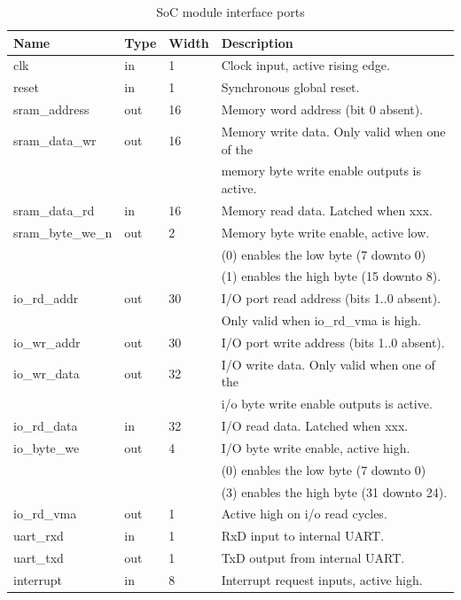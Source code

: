 \begin{table}[h]
\caption{SoC module interface ports}
\begin{tabularx}{\textwidth}{ lll|X }
\toprule
Name & Type & Width & Description \\
\midrule
clk                 & in    & 1  & Clock input, active rising edge. \\
reset               & in    & 1  & Synchronous global reset. \\
\midrule
sram\_address       & out   & 16 & Memory word address (bit 0 absent). \\
sram\_data\_wr      & out   & 16 & Memory write data. Only valid when one of the \\
                    &       &    & memory byte write enable outputs is active.\\
sram\_data\_rd      & in    & 16 & Memory read data. Latched when xxx. \\
sram\_byte\_we\_n   & out   & 2  & Memory byte write enable, active low.  \\
                    &       &    & (0) enables the low byte (7 downto 0) \\
                    &       &    & (1) enables the high byte (15 downto 8). \\
\midrule
io\_rd\_addr        & out   & 30 & I/O port read address (bits 1..0 absent). \\
                    &       &    & Only valid when io\_rd\_vma is high. \\
io\_wr\_addr        & out   & 30 & I/O port write address (bits 1..0 absent). \\
io\_wr\_data        & out   & 32 & I/O write data.  Only valid when one of the \\
                    &       &    & i/o byte write enable outputs is active.\\
io\_rd\_data        & in    & 32 & I/O read data. Latched when xxx. \\
io\_byte\_we        & out   & 4  & I/O byte write enable, active high. \\
                    &       &    & (0) enables the low byte (7 downto 0) \\
                    &       &    & (3) enables the high byte (31 downto 24). \\
io\_rd\_vma         & out   & 1  & Active high on i/o read cycles. \\
\midrule
uart\_rxd           & in    & 1  & RxD input to internal UART. \\
uart\_txd           & out   & 1  & TxD output from internal UART. \\
\midrule
interrupt           & in    & 8  & Interrupt request inputs, active high. \\
\bottomrule
\end{tabularx}
\end{table}

